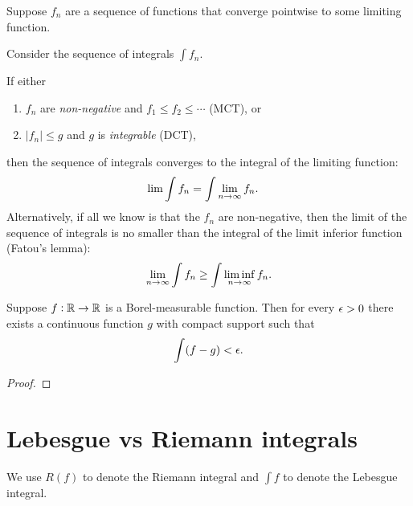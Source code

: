 \begin{theorem*}
  Suppose $f_n$ are a sequence of functions that converge pointwise to some limiting function.

  Consider the sequence of integrals $\int f_n$.

  If either
  \begin{enumerate}
  \item $f_n$ are {\it non-negative} and $f_1 \leq f_2 \leq \cdots$ (MCT), or
  \item $|f_n| \leq g$ and $g$ is {\it integrable} (DCT),
  \end{enumerate}
  then the sequence of integrals converges to the integral of the limiting function:
  \begin{align*}
    \lim \int f_n &= \int \limn f_n.
  \end{align*}
  Alternatively, if all we know is that the $f_n$ are non-negative, then the limit of the sequence of integrals
  is no smaller than the integral of the limit inferior function (Fatou's lemma):
  \begin{align*}
  \limn \int f_n \geq \int \liminf_{n\to\infty} f_n.
  \end{align*}
\end{theorem*}

\begin{theorem*}
  Suppose $f: \mathbb{R} \to \mathbb{R}$ is a Borel-measurable function. Then for every $\epsilon > 0$ there exists a continuous
  function $g$ with compact support such that
  \begin{align*}
    \int (f - g) < \epsilon.
  \end{align*}
\end{theorem*}

\begin{proof}
\end{proof}

\section{Lebesgue vs Riemann integrals}

We use $R(f)$ to denote the Riemann integral and $\int f$ to denote the Lebesgue integral.

